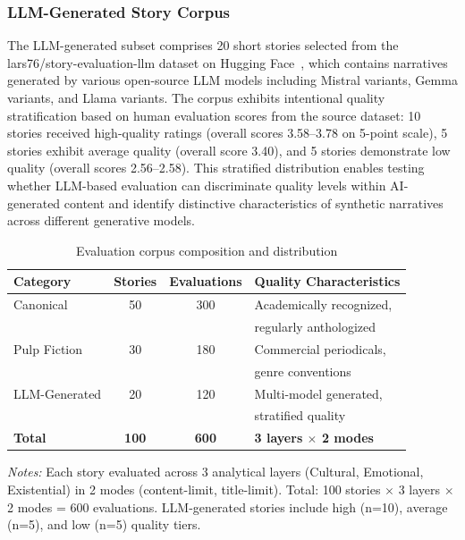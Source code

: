 \subsubsection{LLM-Generated Story Corpus}

The LLM-generated subset comprises 20 short stories selected from the lars76/story-evaluation-llm dataset on Hugging Face~\cite{huggingface-story-eval}, which contains narratives generated by various open-source LLM models including Mistral variants, Gemma variants, and Llama variants. The corpus exhibits intentional quality stratification based on human evaluation scores from the source dataset: 10 stories received high-quality ratings (overall scores 3.58--3.78 on 5-point scale), 5 stories exhibit average quality (overall score 3.40), and 5 stories demonstrate low quality (overall scores 2.56--2.58). This stratified distribution enables testing whether LLM-based evaluation can discriminate quality levels within AI-generated content and identify distinctive characteristics of synthetic narratives across different generative models.

\begin{table}[t]
\centering
\caption{Evaluation corpus composition and distribution}
\label{tab:corpus_composition}
\small
\begin{tabular}{lccl}
\toprule
\textbf{Category} & \textbf{Stories} & \textbf{Evaluations} & \textbf{Quality Characteristics} \\
\midrule
Canonical & 50 & 300 & Academically recognized, \\
          &    &     & regularly anthologized \\
\midrule
Pulp Fiction & 30 & 180 & Commercial periodicals, \\
             &    &     & genre conventions \\
\midrule
LLM-Generated & 20 & 120 & Multi-model generated, \\
              &    &     & stratified quality \\
\midrule
\textbf{Total} & \textbf{100} & \textbf{600} & \textbf{3 layers $\times$ 2 modes} \\
\bottomrule
\end{tabular}
\vspace{0.1cm}

\small
\textit{Notes:} Each story evaluated across 3 analytical layers (Cultural, Emotional, Existential) in 2 modes (content-limit, title-limit). Total: 100 stories $\times$ 3 layers $\times$ 2 modes = 600 evaluations. LLM-generated stories include high (n=10), average (n=5), and low (n=5) quality tiers.
\end{table}

